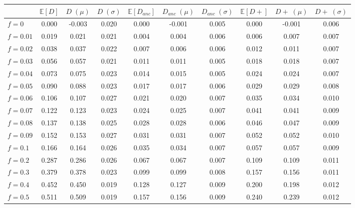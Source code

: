 \begin{tabular}{lccccccccc}
\toprule
 & $\mathbb{E}[D]$ & $D \;(\mu)$ & $D \;(\sigma)$ & $\mathbb{E}[D_{anc}]$ & $D_{anc} \;(\mu)$ & $D_{anc} \;(\sigma)$ & $\mathbb{E}[D+]$ & $D+ \;(\mu)$ & $D+ \;(\sigma)$ \\
\midrule
$f = 0$ & 0.000 & -0.003 & 0.020 & 0.000 & -0.001 & 0.005 & 0.000 & -0.001 & 0.006 \\
$f = 0.01$ & 0.019 & 0.021 & 0.021 & 0.004 & 0.004 & 0.006 & 0.006 & 0.007 & 0.007 \\
$f = 0.02$ & 0.038 & 0.037 & 0.022 & 0.007 & 0.006 & 0.006 & 0.012 & 0.011 & 0.007 \\
$f = 0.03$ & 0.056 & 0.057 & 0.021 & 0.011 & 0.011 & 0.005 & 0.018 & 0.018 & 0.007 \\
$f = 0.04$ & 0.073 & 0.075 & 0.023 & 0.014 & 0.015 & 0.005 & 0.024 & 0.024 & 0.007 \\
$f = 0.05$ & 0.090 & 0.088 & 0.023 & 0.017 & 0.017 & 0.006 & 0.029 & 0.029 & 0.008 \\
$f = 0.06$ & 0.106 & 0.107 & 0.027 & 0.021 & 0.020 & 0.007 & 0.035 & 0.034 & 0.010 \\
$f = 0.07$ & 0.122 & 0.123 & 0.023 & 0.024 & 0.025 & 0.007 & 0.041 & 0.041 & 0.009 \\
$f = 0.08$ & 0.137 & 0.138 & 0.025 & 0.028 & 0.028 & 0.006 & 0.046 & 0.047 & 0.009 \\
$f = 0.09$ & 0.152 & 0.153 & 0.027 & 0.031 & 0.031 & 0.007 & 0.052 & 0.052 & 0.010 \\
$f = 0.1$ & 0.166 & 0.164 & 0.026 & 0.035 & 0.034 & 0.007 & 0.057 & 0.057 & 0.009 \\
$f = 0.2$ & 0.287 & 0.286 & 0.026 & 0.067 & 0.067 & 0.007 & 0.109 & 0.109 & 0.011 \\
$f = 0.3$ & 0.379 & 0.378 & 0.023 & 0.099 & 0.099 & 0.008 & 0.157 & 0.156 & 0.011 \\
$f = 0.4$ & 0.452 & 0.450 & 0.019 & 0.128 & 0.127 & 0.009 & 0.200 & 0.198 & 0.012 \\
$f = 0.5$ & 0.511 & 0.509 & 0.019 & 0.157 & 0.156 & 0.009 & 0.240 & 0.239 & 0.012 \\
\bottomrule
\end{tabular}
